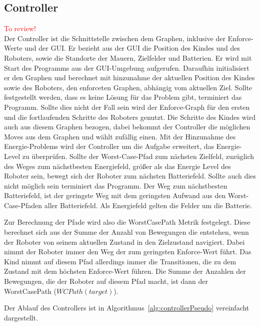 \subsection{Controller}\textcolor{red}{To review!}\\
Der Controller ist die Schnittstelle zwischen dem Graphen, inklusive der Enforce-Werte und der GUI. Er bezieht aus der GUI die Position des Kindes und des Roboters, sowie die Standorte der Mauern, Zielfelder und Batterien. Er wird mit Start des Programms aus der GUI-Umgebung aufgerufen. Daraufhin initialisiert er den Graphen und berechnet mit hinzunahme der aktuellen Position des Kindes sowie des Roboters, den enforceten Graphen, abhängig vom aktuellen Ziel. Sollte festgestellt werden, dass es keine Lösung für das Problem gibt, terminiert das Programm. Sollte dies nicht der Fall sein wird der Enforce-Graph für den ersten und die fortlaufenden Schritte des Roboters genutzt. Die Schritte des Kindes wird auch aus diesem Graphen bezogen, dabei bekommt der Controller die möglichen Moves aus dem Graphen und wählt zufällig einen. Mit der Hinzunahme des Energie-Problems wird der Controller um die Aufgabe erweitert, das Energie-Level zu überprüfen. Sollte der Worst-Case-Pfad zum nächsten Zielfeld, zuzüglich des Weges zum nächstbesten Energiefeld, größer als das Energie Level des Roboter sein, bewegt sich der Roboter zum nächsten Batteriefeld. Sollte auch dies nicht möglich sein terminiert das Programm. Der Weg zum nächstbesten Batteriefeld, ist der geringste Weg mit dem geringsten Aufwand aus den Worst-Case-Pfaden aller Batteriefeld. Als Energiefeld gelten die Felder um die Batterie.

Zur Berechnung der Pfade wird also die WorstCasePath Metrik festgelegt. Diese berechnet sich aus der Summe der Anzahl von Bewegungen die entstehen, wenn der Roboter von seinem aktuellen Zustand in den Zielzustand navigiert. Dabei nimmt der Roboter immer den Weg der zum geringsten Enforce-Wert führt. Das Kind nimmt auf diesem Pfad allerdings immer die Transitionen, die zu dem Zustand mit dem höchsten Enforce-Wert führen. Die Summe der Anzahlen der Bewegungen, die der Roboter auf diesem Pfad macht, ist dann der WorstCasePath ($WCPath(target)$).

Der Ablauf des Controllers ist in Algorithmus~\autoref{alg:controllerPseudo} vereinfacht dargestellt.

